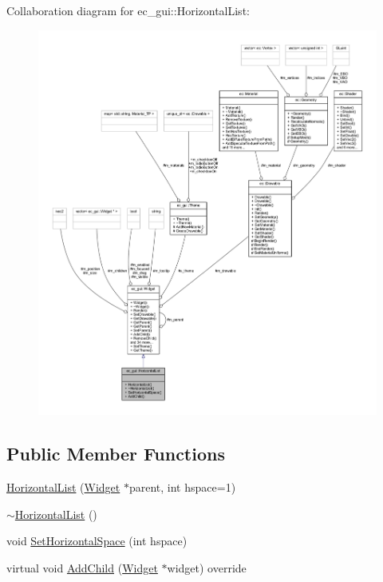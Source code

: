 Collaboration diagram for ec\+\_\+gui\+:\+:Horizontal\+List\+:\nopagebreak
\begin{figure}[H]
\begin{center}
\leavevmode
\includegraphics[width=350pt]{classec__gui_1_1_horizontal_list__coll__graph}
\end{center}
\end{figure}
\subsection*{Public Member Functions}
\begin{DoxyCompactItemize}
\item 
\mbox{\hyperlink{classec__gui_1_1_horizontal_list_adac2ef5c6045a59399caa45bc2b41c3e}{Horizontal\+List}} (\mbox{\hyperlink{classec__gui_1_1_widget}{Widget}} $\ast$parent, int hspace=1)
\item 
\mbox{\hyperlink{classec__gui_1_1_horizontal_list_aba34eabe0c77ab8fbc267ecd2a59a2f6}{$\sim$\+Horizontal\+List}} ()
\item 
void \mbox{\hyperlink{classec__gui_1_1_horizontal_list_a2a05b26a25043bb39523edcea32547c5}{Set\+Horizontal\+Space}} (int hspace)
\item 
virtual void \mbox{\hyperlink{classec__gui_1_1_horizontal_list_abf74f325e380e8b26aeac0018995312c}{Add\+Child}} (\mbox{\hyperlink{classec__gui_1_1_widget}{Widget}} $\ast$widget) override
\end{DoxyCompactItemize}
